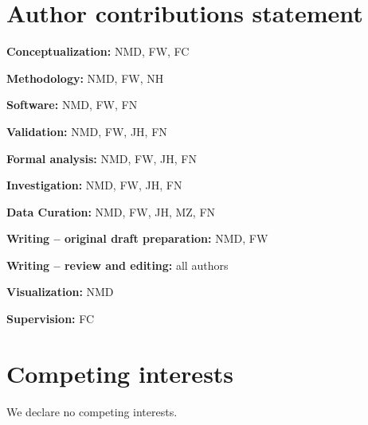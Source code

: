 \documentclass[fleqn,10pt]{wlscirep}
\begin{document}
\section*{Author contributions statement}

\textbf{Conceptualization:} NMD, FW, FC

\noindent \textbf{Methodology:} NMD, FW, NH 	

\noindent \textbf{Software:} NMD, FW, FN	

\noindent \textbf{Validation:} NMD, FW, JH, FN	

\noindent \textbf{Formal analysis:} NMD, FW, JH, FN	

\noindent \textbf{Investigation:} NMD, FW, JH, FN

\noindent \textbf{Data Curation:} NMD, FW, JH, MZ, FN

\noindent \textbf{Writing – original draft preparation:} NMD, FW	

\noindent \textbf{Writing – review and editing:} all authors  

\noindent \textbf{Visualization:} NMD	

\noindent \textbf{Supervision:} FC


\section*{Competing interests}

We declare no competing interests.
\end{document}
